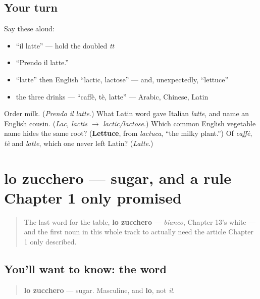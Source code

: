 \subsection*{Your turn}
Say these aloud:

\begin{itemize}
\raggedright
  \item \textquotedblleft{}il latte\textquotedblright{} — hold the doubled \emph{tt}
  \item \textquotedblleft{}Prendo il latte.\textquotedblright{}
  \item \textquotedblleft{}latte\textquotedblright{} then English \textquotedblleft{}lactic, lactose\textquotedblright{} — and, unexpectedly, \textquotedblleft{}lettuce\textquotedblright{}
  \item the three drinks — \textquotedblleft{}caffè, tè, latte\textquotedblright{} — Arabic, Chinese, Latin
\end{itemize}

\begin{tcolorbox}[breakable,colback=teal!4,colframe=teal!35!black,title={Before you move on}]
Order milk. (\emph{Prendo il latte}.) What Latin word gave Italian \emph{latte}, and name an English cousin. (\emph{Lac, lactis} $\to$ \emph{lactic/lactose}.) Which common English vegetable name hides the same root? (\textbf{Lettuce}, from \emph{lactuca}, \textquotedblleft{}the milky plant.\textquotedblright{}) Of \emph{caffè}, \emph{tè} and \emph{latte}, which one never left Latin? (\emph{Latte}.)
\end{tcolorbox}
\section[lo zucchero]{lo zucchero — sugar, and a rule Chapter 1 only promised}

\label{lesson:IT-C22-zucchero}



\begin{quote}
The last word for the table, \textbf{lo zucchero} — \emph{bianco}, Chapter 13's white — and the first noun in this whole track to actually need the article Chapter 1 only described.
\end{quote}

\subsection*{You'll want to know: the word}
\begin{quote}
\textbf{lo zucchero} — sugar. Masculine, and \textbf{lo}, not \emph{il}.
\end{quote}

